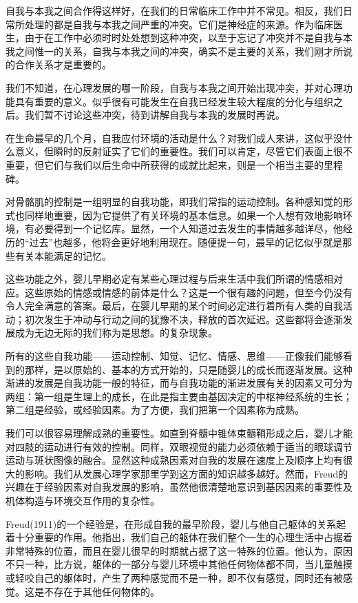 \documentclass[UTF8,10pt,a4paper,openany]{book}
\begin{document}
自我与本我之间合作得这样好，在我们的日常临床工作中并不常见。相反，我们日常所处理的都是自我与本我之间严重的冲突。它们是神经症的来源。作为临床医生，由于在工作中必须时时处处想到这种冲突，以至于忘记了冲突并不是自我与本我之间惟一的关系，自我与本我之间的冲突，确实不是主要的关系，我们刚才所说的合作关系才是重要的。

我们不知道，在心理发展的哪一阶段，自我与本我之间开始出现冲突，并对心理功能具有重要的意义。似乎很有可能发生在自我已经发生较大程度的分化与组织之后。我们暂不讨论这些冲突，待到讲解自我与本我的发展时再说。

在生命最早的几个月，自我应付环境的活动是什么？对我们成人来讲，这似乎没什么意义，但瞬时的反射证实了它们的重要性。我们可以肯定，尽管它们表面上很不重要，但它们与我们以后生命中所获得的成就比起来，则是一个相当主要的里程碑。

对骨骼肌的控制是一组明显的自我功能，即我们常指的运动控制。各种感知觉的形式也同样地重要，因为它提供了有关环境的基本信息。如果一个人想有效地影响环境，有必要得到一个记忆库。显然，一个人知道过去发生的事情越多越详尽，他经历的“过去”也越多，他将会更好地利用现在。随便提一句，最早的记忆似乎就是那些有关本能满足的记忆。

这些功能之外，婴儿早期必定有某些心理过程与后来生活中我们所谓的情感相对应。这些原始的情感或情感的前体是什么？这是一个很有趣的问题，但至今仍没有令人完全满意的答案。最后，在婴儿早期的某个时间必定进行着所有人类的自我活动；初次发生于冲动与行动之间的犹豫不决，释放的首次延迟。这些都将会逐渐发展成为无边无际的我们称为是思想。的复杂现象。

所有的这些自我功能——运动控制、知觉、记忆、情感、思维——正像我们能够看到的那样，是以原始的、基本的方式开始的，只是随婴儿的成长而逐渐发展。这种渐进的发展是自我功能一般的特征，而与自我功能的渐进发展有关的因素又可分为两组：第一组是生理上的成长，在此是指主要由基因决定的中枢神经系统的生长；第二组是经验，或经验因素。为了方便，我们把第一个因素称为成熟。

我们可以很容易理解成熟的重要性。如直到脊髓中锥体束髓鞘形成之后，婴儿才能对四肢的运动进行有效的控制。同样，双眼视觉的能力必须依赖于适当的眼球调节运动与斑状图像的融合。显然这种成熟因素对自我的发展在速度上及顺序上均有很大的影响。我们从发展心理学家那里学到这方面的知识越多越好。然而，Freud的兴趣在于经验因素对自我发展的影响，虽然他很清楚地意识到基因因素的重要性及机体构造与环境交互作用的复杂性。

Freud(1911)的一个经验是，在形成自我的最早阶段，婴儿与他自己躯体的关系起着十分重要的作用。他指出，我们自己的躯体在我们整个一生的心理生活中占据着非常特殊的位置，而且在婴儿很早的时期就占据了这一特殊的位置。他认为，原因不只一种，比方说，躯体的一部分与婴儿环境中其他任何物体都不同，当儿童触摸或轻咬自己的躯体时，产生了两种感觉而不是一种，即不仅有感觉，同时还有被感觉。这是不存在于其他任何物体的。
\end{document}
